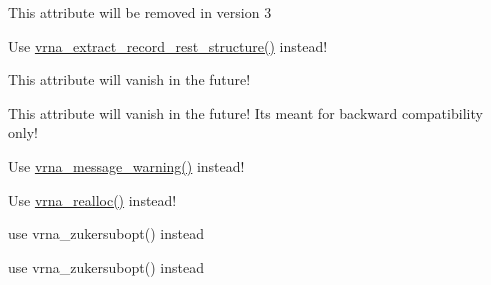 \begin{DoxyRefList}
\item[\label{deprecated__deprecated000101}%
\Hypertarget{deprecated__deprecated000101}%
Global \mbox{\hyperlink{group__energy__parameters_a378d5bcf2bae1f3ec84c912c7d3908d2}{vrna\+\_\+exp\+\_\+param\+\_\+s\+:\+:id}} ]This attribute will be removed in version 3  
\item[\label{deprecated__deprecated000066}%
\Hypertarget{deprecated__deprecated000066}%
Global \mbox{\hyperlink{group__file__utils_ga55a9ae6dfeecc1b3f0c2acf6fa796c15}{vrna\+\_\+extract\+\_\+record\+\_\+rest\+\_\+constraint}} (char $\ast$$\ast$cstruc, const char $\ast$$\ast$lines, unsigned int option)]Use \mbox{\hyperlink{group__file__utils_gad37cbb63a05eed63ba25c91628409be0}{vrna\+\_\+extract\+\_\+record\+\_\+rest\+\_\+structure()}} instead!  
\item[\label{deprecated__deprecated000084}%
\Hypertarget{deprecated__deprecated000084}%
Global \mbox{\hyperlink{group__fold__compound_abf5e82d14649b6179ae60ed7da6e4fc0}{vrna\+\_\+fc\+\_\+s\+:\+:pscore\+\_\+pf\+\_\+compat}} ]This attribute will vanish in the future!  
\item[\label{deprecated__deprecated000083}%
\Hypertarget{deprecated__deprecated000083}%
Global \mbox{\hyperlink{group__fold__compound_a7fe1235ce3d41287695f1ae1e283e8fc}{vrna\+\_\+fc\+\_\+s\+:\+:ptype\+\_\+pf\+\_\+compat}} ]This attribute will vanish in the future! It\textquotesingle{}s meant for backward compatibility only!  
\item[\label{deprecated__deprecated000158}%
\Hypertarget{deprecated__deprecated000158}%
Global \mbox{\hyperlink{utils_8h_af2355fa8746f2f30fbe71db65dea3d51}{warn\+\_\+user}} (const char message\mbox{[}\mbox{]})]Use \mbox{\hyperlink{group__utils_ga6e07ed24add60693ba886d54d0a46635}{vrna\+\_\+message\+\_\+warning()}} instead!  
\item[\label{deprecated__deprecated000161}%
\Hypertarget{deprecated__deprecated000161}%
Global \mbox{\hyperlink{utils_8h_a9037ada838835b1b9db41581a021b0c8}{xrealloc}} (void $\ast$p, unsigned size)]Use \mbox{\hyperlink{group__utils_ga27f4719a66c6f90d1cca3d1e6e696c6a}{vrna\+\_\+realloc()}} instead!  
\item[\label{deprecated__deprecated000153}%
\Hypertarget{deprecated__deprecated000153}%
Global \mbox{\hyperlink{group__subopt__zuker_ga0d5104e3ecf119d8eabd40aa5fe47f90}{zukersubopt}} (const char $\ast$string)]use vrna\+\_\+zukersubopt() instead 
\item[\label{deprecated__deprecated000154}%
\Hypertarget{deprecated__deprecated000154}%
Global \mbox{\hyperlink{group__subopt__zuker_gab6d0ea8cc1d02f6dd831ca81043c9eb8}{zukersubopt\+\_\+par}} (const char $\ast$string, vrna\+\_\+param\+\_\+t $\ast$parameters)]use vrna\+\_\+zukersubopt() instead
\end{DoxyRefList}